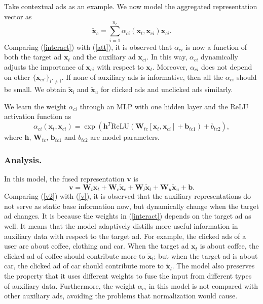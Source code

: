 \documentclass[sigconf]{acmart}
\begin{document}
Take contextual ads as an example. We now model the aggregated representation vector as
\begin{equation} \label{interact}
\tilde{\mathbf{x}}_c = \sum_{i=1}^{n_c} \alpha_{ci}(\mathbf{x}_t, \mathbf{x}_{ci}) \mathbf{x}_{ci}.
\end{equation}
Comparing (\ref{interact}) with (\ref{att}), it is observed that $\alpha_{ci}$ is now a function of both the target ad $\mathbf{x}_t$ and the auxiliary ad $\mathbf{x}_{ci}$. In this way, $\alpha_{ci}$ dynamically adjusts the importance of $\mathbf{x}_{ci}$ with respect to $\mathbf{x}_t$.
Moreover, $\alpha_{ci}$ does not depend on other $\{\mathbf{x}_{ci'}\}_{i'\neq i}$. If none of auxiliary ads is informative, then all the $\alpha_{ci}$ should be small. We obtain $\tilde{\mathbf{x}}_l$ and $\tilde{\mathbf{x}}_u$ for clicked ads and unclicked ads similarly.

We learn the weight $\alpha_{ci}$ through an MLP with one hidden layer and the ReLU activation function as
\begin{equation}
\alpha_{ci}(\mathbf{x}_t, \mathbf{x}_{ci}) = \exp (\mathbf{h}^T \mathrm{ReLU}(\mathbf{W}_{tc} [\mathbf{x}_t, \mathbf{x}_{ci}]+ \mathbf{b}_{tc1} ) + b_{tc2}),
\end{equation}
where $\mathbf{h}$, $\mathbf{W}_{tc}$, $\mathbf{b}_{tc1}$ and $b_{tc2}$ are model parameters.

\subsubsection{Analysis.}
In this model, the fused representation $\mathbf{v}$ is
\begin{equation} \label{v2}
\mathbf{v} = \mathbf{W}_t \mathbf{x}_t + \mathbf{W}_c \tilde{\mathbf{x}}_c + \mathbf{W}_l \tilde{\mathbf{x}}_l + \mathbf{W}_u \tilde{\mathbf{x}}_u + \mathbf{b}.
\end{equation}
Comparing (\ref{v2}) with (\ref{v}), it is observed that the auxiliary representations do not serve as static base information now, but dynamically change when the target ad changes. It is because the weights in (\ref{interact}) depends on the target ad as well. It means that the model adaptively distills more useful information in auxiliary data with respect to the target ad. For example, the clicked ads of a user are about coffee, clothing and car. When the target ad $\mathbf{x}_t$ is about coffee, the clicked ad of coffee should contribute more to $\tilde{\mathbf{x}}_l$; but when the target ad is about car, the clicked ad of car should contribute more to $\tilde{\mathbf{x}}_l$. The model also preserves the property that it uses different weights to fuse the input from different types of auxiliary data. Furthermore, the weight $\alpha_{ci}$ in this model is not compared with other auxiliary ads, avoiding the problems that normalization would cause.
\end{document}
